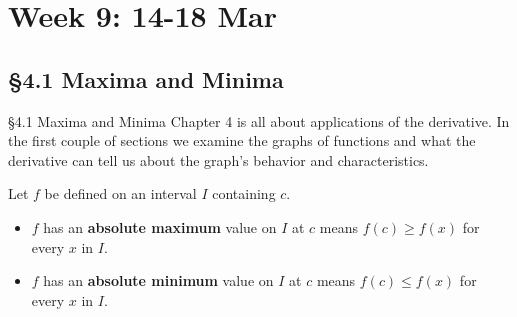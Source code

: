 \documentclass[cal1spr16Lectures.tex]{subfiles}
\begin{document}
\section[Week 9]{Week 9: 14-18 Mar}

\subsection[4.1 Maxima and Minima]{\S 4.1 Maxima and Minima}

\begin{frame}{\S 4.1 Maxima and Minima}
Chapter 4 is all about applications of the derivative.  In the first couple of sections we examine the graphs of functions and what the derivative can tell us about the graph's behavior and characteristics.
\end{frame}

\begin{frame}
\small 
\begin{dfn} Let $f$ be defined on an interval $I$ containing $c$.
\begin{itemize}
\item $f$ has an {\bf absolute maximum} value on $I$ at $c$ means $f(c)\ge f(x)$ for every $x$ in $I$.
\item $f$ has an {\bf absolute minimum} value on $I$ at $c$ means $f(c)\le f(x)$ for every $x$ in $I$.
\end{itemize}
\end{dfn}
\end{frame}
\end{document}
